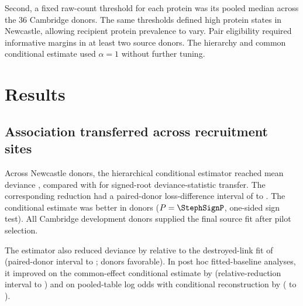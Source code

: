 \documentclass[pdflatex,sn-vancouver-num,iicol]{sn-jnl}
\begin{document}
Second, a fixed raw-count threshold for each protein was its pooled median across the 36 Cambridge donors. The same thresholds defined high protein states in Newcastle, allowing recipient protein prevalence to vary. Pair eligibility required informative margins in at least two source donors. The hierarchy and common conditional estimate used $\alpha=1$ without further tuning.

\section{Results}

\subsection{Association transferred across recruitment sites}

Across \StephHeldN{} Newcastle donors, the hierarchical conditional estimator reached mean deviance \StephPrimaryLoss{}, compared with \StephResidualLoss{} for signed-root deviance-statistic transfer. The corresponding \StephResidualReduction{} reduction had a paired-donor loss-difference interval of \StephResidualCILo{} to \StephResidualCIHi{}. The conditional estimate was better in \StephResidualFav{} donors ($P=\StephSignP$, one-sided sign test). All \StephDevN{} Cambridge development donors supplied the final source fit after pilot selection.

The estimator also reduced deviance by \StephDestroyedReduction{} relative to the destroyed-link fit of \StephDestroyedLoss{} (paired-donor interval \StephDestroyedCILo{} to \StephDestroyedCIHi{}; \StephDestroyedFav{} donors favorable). In post hoc fitted-baseline analyses, it improved on the common-effect conditional estimate by \StephCommonExactReduction{} (relative-reduction interval \StephCommonExactReductionLo{} to \StephCommonExactReductionHi{}) and on pooled-table log odds with conditional reconstruction by \StephPooledPoissonReduction{} (\StephPooledPoissonReductionLo{} to \StephPooledPoissonReductionHi{}).
\end{document}
